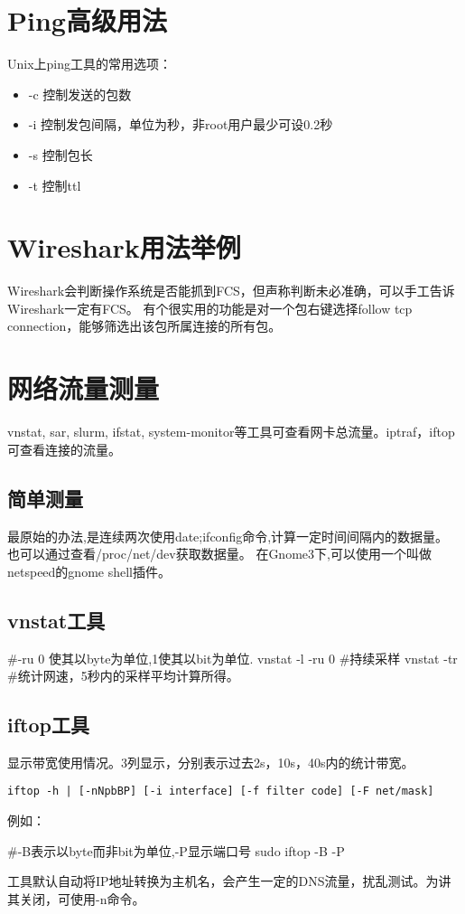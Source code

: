 \section{Ping高级用法}
Unix上ping工具的常用选项：
\begin{itemize}
    \item 
        -c 控制发送的包数
    \item 
        -i 控制发包间隔，单位为秒，非root用户最少可设0.2秒
    \item 
        -s 控制包长
    \item 
        -t 控制ttl
\end{itemize}


\section{Wireshark用法举例}
Wireshark会判断操作系统是否能抓到FCS，但声称判断未必准确，可以手工告诉Wireshark一定有FCS。
有个很实用的功能是对一个包右键选择follow tcp connection，能够筛选出该包所属连接的所有包。


\section{网络流量测量}
vnstat, sar, slurm, ifstat, system-monitor等工具可查看网卡总流量。iptraf，iftop可查看连接的流量。

\subsection{简单测量}
最原始的办法,是连续两次使用date;ifconfig命令,计算一定时间间隔内的数据量。
也可以通过查看/proc/net/dev获取数据量。
在Gnome3下,可以使用一个叫做netspeed的gnome shell插件。

\subsection{vnstat工具}
\begin{shellcmd}
#-ru 0 使其以byte为单位,1使其以bit为单位.
vnstat -l -ru 0 #持续采样 
vnstat -tr #统计网速，5秒内的采样平均计算所得。
\end{shellcmd}

\subsection{iftop工具}
显示带宽使用情况。3列显示，分别表示过去2s，10s，40s内的统计带宽。
\begin{verbatim}
iftop -h | [-nNpbBP] [-i interface] [-f filter code] [-F net/mask]
\end{verbatim}
例如：
\begin{shellcmd}
#-B表示以byte而非bit为单位,-P显示端口号
sudo iftop -B -P 
\end{shellcmd}
工具默认自动将IP地址转换为主机名，会产生一定的DNS流量，扰乱测试。为讲其关闭，可使用-n命令。


